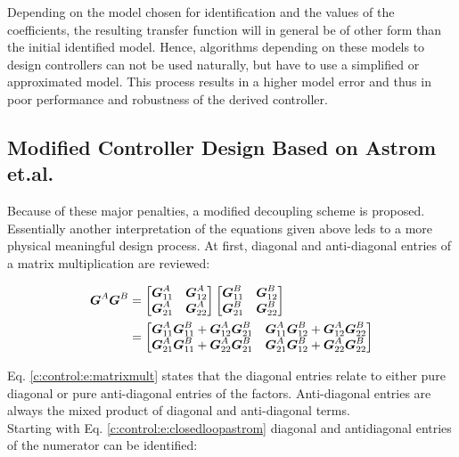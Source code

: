 Depending on the model chosen for identification and the values of the coefficients, the resulting transfer function will in general be of other form than the initial identified model. Hence, algorithms depending on these models to design controllers can not be used naturally, but have to use a simplified or approximated model. This process results in a higher model error and thus in poor performance and robustness of the derived controller.

\subsection*{Modified Controller Design Based on Astrom et.al.}

Because of these major penalties, a modified decoupling scheme is proposed. Essentially another interpretation of the equations given above leds to a more physical meaningful design process. At first, diagonal and anti-diagonal entries of a matrix multiplication are reviewed:

\begin{align}
\begin{split}
\mbox{\boldmath$G$}^{A} \mbox{\boldmath$G$}^{B} &= 
\begin{bmatrix}
\mbox{\boldmath$G$}_{11}^{A} & \mbox{\boldmath$G$}_{12}^{A} \\
\mbox{\boldmath$G$}_{21}^{A} & \mbox{\boldmath$G$}_{22}^{A} 
\end{bmatrix}
\begin{bmatrix}
\mbox{\boldmath$G$}_{11}^{B} & \mbox{\boldmath$G$}_{12}^{B} \\
\mbox{\boldmath$G$}_{21}^{B} & \mbox{\boldmath$G$}_{22}^{B} 
\end{bmatrix}\\
&= \begin{bmatrix}
\mbox{\boldmath$G$}_{11}^{A}\mbox{\boldmath$G$}_{11}^{B} + \mbox{\boldmath$G$}_{12}^{A}\mbox{\boldmath$G$}_{21}^{B} & \mbox{\boldmath$G$}_{11}^{A}\mbox{\boldmath$G$}_{12}^{B} + \mbox{\boldmath$G$}_{12}^{A}\mbox{\boldmath$G$}_{22}^{B} \\
\mbox{\boldmath$G$}_{21}^{A}\mbox{\boldmath$G$}_{11}^{B} + \mbox{\boldmath$G$}_{22}^{A}\mbox{\boldmath$G$}_{21}^{B} &
\mbox{\boldmath$G$}_{21}^{A}\mbox{\boldmath$G$}_{12}^{B} + \mbox{\boldmath$G$}_{22}^{A}\mbox{\boldmath$G$}_{22}^{B}
\end{bmatrix}
\end{split}
\label{c:control:e:matrixmult}
\end{align}

Eq. \ref{c:control:e:matrixmult} states that the diagonal entries relate to either pure diagonal or pure anti-diagonal entries of the factors. Anti-diagonal entries are always the mixed product of diagonal and anti-diagonal terms.\\

Starting with Eq. \ref{c:control:e:closedloopastrom} diagonal and antidiagonal entries of the numerator can be identified:

